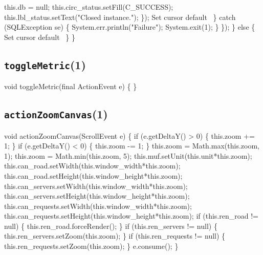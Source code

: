           this.db = null;
          this.circ_status.setFill(C_SUCCESS);
          this.lbl_status.setText("Closed instance.");
        \});
        \LA{}Set cursor default~{\nwtagstyle{}}\RA{}
      \} catch (SQLException se) \{
        System.err.println("Failure");
        System.exit(1);
      \}
    \});
  \} else \{
    \LA{}Set cursor default~{\nwtagstyle{}}\RA{}
  \}
\}
\eatline
{}\nwendcode{}\nwdocspar
\subsection{\texttt{toggleMetric}(1)}
\nwenddocs{}\endmoddef{}
void toggleMetric(final ActionEvent e) \{
\}
\eatline
{}\nwendcode{}\nwdocspar
\subsection{\texttt{actionZoomCanvas}(1)}
\nwenddocs{}\endmoddef{}
void actionZoomCanvas(ScrollEvent e) \{
  if (e.getDeltaY() > 0) \{
    this.zoom += 1;
  \}
  if (e.getDeltaY() < 0) \{
    this.zoom -= 1;
  \}
  this.zoom = Math.max(this.zoom, 1);
  this.zoom = Math.min(this.zoom, 5);
  this.muf.setUnit(this.unit*this.zoom);
  this.can_road.setWidth(this.window_width*this.zoom);
  this.can_road.setHeight(this.window_height*this.zoom);
  this.can_servers.setWidth(this.window_width*this.zoom);
  this.can_servers.setHeight(this.window_height*this.zoom);
  this.can_requests.setWidth(this.window_width*this.zoom);
  this.can_requests.setHeight(this.window_height*this.zoom);
  if (this.ren_road != null) \{
    this.ren_road.forceRender();
  \}
  if (this.ren_servers != null) \{
    this.ren_servers.setZoom(this.zoom);
  \}
  if (this.ren_requests != null) \{
    this.ren_requests.setZoom(this.zoom);
  \}
  e.consume();
\}
\eatline
{}\nwendcode{}\nwdocspar

